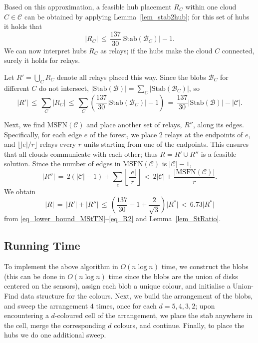 \documentclass[11pt,a4paper]{article}
\newcommand{\floor}[1]{\lfloor{#1}\rfloor}
\newcommand{\s}[1]{{\lvert #1 \rvert}}
\newcommand{\myB}{\mathcal{B}} \newcommand{\myC}{\mathcal{C}} \newcommand{\myD}{\mathcal{D}} \newcommand{\myP}{\mathcal{P}} \newcommand{\myS}{\mathcal{S}}
\newcommand{\MSTN}{\mathrm{MSFN}}
\newcommand{\optstab}{\mathrm{Stab}}
\newcommand{\optrel}{R^{*}}
\newcommand{\rhub}{\frac{137}{30}}
\theoremstyle{definition}
\theoremstyle{remark}
\begin{document}
Based on this approximation, a feasible hub placement $R_C$ within one cloud $C \in \myC$ can be obtained by applying Lemma~\ref{lem_stab2hub}; for this set of hubs it holds that
\[
    \s{R_C}
    \,\le\, \rhub \s{\optstab(\myB_C)} - 1.
\]
We can now interpret hubs $R_C$ as relays; if the hubs make the cloud $C$ connected, surely it holds for relays.

Let $R' = \bigcup_C{R_C}$ denote all relays placed this way. Since the blobs $\myB_C$ for different $C$ do not intersect, $\s{\optstab(\myB)} = \sum_C \s{\optstab(\myB_C)}$, so
\begin{equation}\label{eq_R1}
    \s{R'}
    \,\le\, \sum_C{\s{R_C}}
    \,\le\, \sum_C \left( \rhub \s{\optstab(\myB_C)} - 1 \right)
    \,=\, \rhub \s{\optstab(\myB)} - \s{\myC}.
\end{equation}

Next, we find $\MSTN(\myC)$ and place another set of relays, $R''$, along its edges.  Specifically, for each edge $e$ of the forest, we place $2$ relays at the endpoints of $e$, and  $\floor{\s{e}/r}$ relays every $r$ units starting from one of the endpoints. This ensures that all clouds communicate with each other; thus $R = R' \cup R''$ is a feasible solution. Since the number of edges in $\MSTN(\myC)$ is $\s{\myC}-1$,
\begin{equation}\label{eq_R2}
    \s{R''}
    \,=\, 2(\s{\myC} - 1) + \sum_e \left\lfloor \frac{\s{e}}{r} \right\rfloor
    \,<\, 2\s{\myC} +  \frac{\s{\MSTN(\myC)}}{r}.
\end{equation}
We obtain
\[
    \s{R}
    \,=\, \s{R'} + \s{R''}
    \,\le\, \left(\rhub + 1 + \frac{2}{\sqrt{3}}\right) \s{\optrel}
    \,<\, 6.73 \s{\optrel}
\]
from \eqref{eq_lower_bound_MStTN}--\eqref{eq_R2} and Lemma~\ref{lem_StRatio}.

\subsection{Running Time}

To implement the above algorithm in $O(n\log n)$ time, we construct the blobs (this can be done in $O(n\log n)$ time since the blobs are the union of disks centered on the sensors), assign each blob a unique colour, and initialise a Union-Find data structure for the colours. Next, we build the arrangement of the blobs, and sweep the arrangement $4$ times, once for each $d=5,4,3,2$; upon encountering a $d$-coloured cell of the arrangement, we place the stab anywhere in the cell, merge the corresponding $d$ colours, and continue. Finally, to place the hubs we do one additional sweep.
\end{document}
